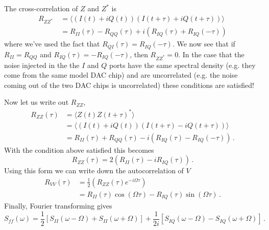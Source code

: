 The cross-correlation of $Z$ and $Z^*$ is
\begin{align}
R_{ZZ^*}\
&= \langle (I(t) + i Q(t))(I(t+\tau) + i Q(t+\tau)) \rangle \\
&= R_{II}(\tau) - R_{QQ}(\tau) + i \left( R_{IQ}(\tau) + R_{IQ}(-\tau) \right)
\end{align}
where we've used the fact that $R_{QI}(\tau) = R_{IQ}(-\tau)$.
We now see that if $R_{II} = R_{QQ}$ and $R_{IQ}(\tau) = - R_{IQ}(-\tau)$, then $R_{ZZ^*} = 0$.
In the case that the noise injected in the the $I$ and $Q$ ports have the same spectral density (e.g. they come from the same model DAC chip) and are uncorrelated (e.g. the noise coming out of the two DAC chips is uncorrelated) these conditions are satisfied!

Now let us write out $R_{ZZ}$,
\begin{align}
R_{ZZ}(\tau)
&= \langle Z(t) Z(t+\tau)^* \rangle \\
&= \langle (I(t) + i Q(t))(I(t+\tau) - i Q(t+\tau)) \rangle \\
&= R_{II}(\tau) + R_{QQ}(\tau) - i \left( R_{IQ}(\tau) - R_{IQ}(-\tau) \right) \, .
\end{align}
With the condition above satisfied this becomes
\begin{equation}
R_{ZZ}(\tau) = 2 \left( R_{II}(\tau) - i R_{IQ}(\tau) \right) \, .
\end{equation}
Using this form we can write down the autocorrelation of $V$
\begin{align}
R_{VV}(\tau)
&= \frac{1}{2} \left( R_{ZZ}(\tau) e^{-i \Omega \tau} \right) \\
&= R_{II}(\tau) \cos(\Omega \tau) - R_{IQ}(\tau) \sin(\Omega \tau) \, . 
\end{align}
Finally, Fourier transforming gives
\begin{equation}
S_{ff}(\omega) =
\frac{1}{2} \left[ S_{II}(\omega - \Omega) + S_{II}(\omega + \Omega) \right]
+ \frac{1}{2i} \left[ S_{IQ}(\omega - \Omega) - S_{IQ}(\omega + \Omega) \right] \, .
\end{equation}

